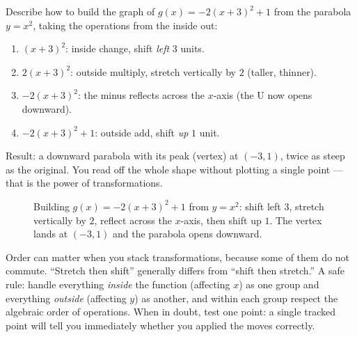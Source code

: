 \begin{example}
\label{ch02:ex-transform}
Describe how to build the graph of $g(x) = -2(x+3)^2 + 1$ from the parabola
$y = x^2$, taking the operations from the inside out:
\begin{enumerate}
  \item $(x+3)^2$: inside change, shift \emph{left} $3$ units.
  \item $2(x+3)^2$: outside multiply, stretch vertically by $2$ (taller, thinner).
  \item $-2(x+3)^2$: the minus reflects across the $x$-axis (the U now opens
        downward).
  \item $-2(x+3)^2 + 1$: outside add, shift \emph{up} $1$ unit.
\end{enumerate}
Result: a downward parabola with its peak (vertex) at $(-3, 1)$, twice as steep as
the original. You read off the whole shape without plotting a single point ---
that is the power of transformations.
\end{example}

\begin{figure}[H]
\centering
{}
\caption{Building $g(x)=-2(x+3)^2+1$ from $y=x^2$: shift left $3$, stretch
vertically by $2$, reflect across the $x$-axis, then shift up $1$. The vertex
lands at $(-3,1)$ and the parabola opens downward.}
\label{ch02:fig-transform-example}
\end{figure}

\begin{trapbox}
Order can matter when you stack transformations, because some of them do not
commute. ``Stretch then shift'' generally differs from ``shift then stretch.'' A
safe rule: handle everything \emph{inside} the function (affecting $x$) as one
group and everything \emph{outside} (affecting $y$) as another, and within each
group respect the algebraic order of operations. When in doubt, test one point: a
single tracked point will tell you immediately whether you applied the moves
correctly.
\end{trapbox}


